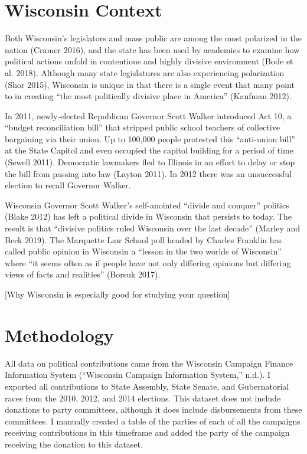 \documentclass[12pt,]{article}
\begin{document}
\hypertarget{wisconsin-context}{%
\section{Wisconsin Context}\label{wisconsin-context}}

Both Wisconsin's legislators and mass public are among the most
polarized in the nation (Cramer 2016), and the state has been used by
academics to examine how political actions unfold in contentious and
highly divisive environment (Bode et al. 2018). Although many state
legislatures are also experiencing polarization (Shor 2015), Wisconsin
is unique in that there is a single event that many point to in creating
``the most politically divisive place in America'' (Kaufman 2012).

In 2011, newly-elected Republican Governor Scott Walker introduced Act
10, a ``budget reconciliation bill'' that stripped public school
teachers of collective bargaining via their union. Up to 100,000 people
protested this ``anti-union bill'' at the State Capitol and even
occupied the capitol building for a period of time (Sewell 2011).
Democratic lawmakers fled to Illinois in an effort to delay or stop the
bill from passing into law (Layton 2011). In 2012 there was an
unsuccessful election to recall Governor Walker.

Wisconsin Governor Scott Walker's self-anointed ``divide and conquer''
politics (Blake 2012) has left a political divide in Wisconsin that
persists to today. The result is that ``divisive politics ruled
Wisconsin over the last decade'' (Marley and Beck 2019). The Marquette
Law School poll headed by Charles Franklin has called public opinion in
Wisconsin a ``lesson in the two worlds of Wisconsin'' where ``it seems
often as if people have not only differing opinions but differing views
of facts and realities'' (Borsuk 2017).

{[}Why Wisconsin is especially good for studying your question{]}

\hypertarget{methodology}{%
\section{Methodology}\label{methodology}}

All data on political contributions came from the Wisconsin Campaign
Finance Information System (``Wisconsin Campaign Information System,''
n.d.). I exported all contributions to State Assembly, State Senate, and
Gubernatorial races from the 2010, 2012, and 2014 elections. This
dataset does not include donations to party committees, although it does
include disbursements from these committees. I manually created a table
of the parties of each of all the campaigns receiving contributions in
this timeframe and added the party of the campaign receiving the
donation to this dataset.
\end{document}

